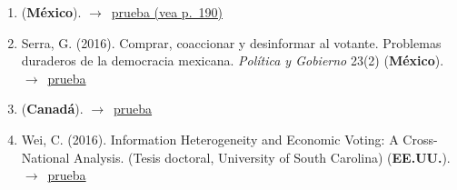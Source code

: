 \documentclass[12 pt, letter]{article}
\newenvironment{CitasMiTrabajo}{
    \begin{footnotesize}
    \begin{enumerate}[label={\footnotesize\emph{cita~\arabic*}},ref=\arabic*] %
        \setlength{\itemsep}{.1\itemsep}
        \setlength{\parskip}{.1\parskip}
    }{\end{enumerate}\end{footnotesize}}
\begin{document}
        


        \begin{CitasMiTrabajo}
        \item {} (\textbf{M\'exico}). $\rightarrow$~\href{http://www.politicaygobierno.cide.edu/index.php/pyg/article/view/1297/988}{prueba (vea p.\ 190)}

        \item Serra, G. (2016). Comprar, coaccionar y desinformar al votante. Problemas duraderos de la democracia mexicana. \emph{Pol\'itica y Gobierno} 23(2) (\textbf{M\'exico}). $\rightarrow$~\href{http://www.scielo.org.mx/scielo.php?pid=S1665-20372016000200409&script=sci_arttext&tlng=en}{prueba}          

        \item {} (\textbf{Canad\'a}). $\rightarrow$~\href{http://www.ieim.uqam.ca/IMG/pdf/chroniques_des_ameriques_-_nafta.pdf}{prueba}

        \item Wei, C. (2016). Information Heterogeneity and Economic Voting: A Cross-National Analysis. (Tesis doctoral, University of South Carolina) (\textbf{EE.UU.}). $\rightarrow$~\href{https://scholarcommons.sc.edu/etd/3847}{prueba}          


          
        \label{ncites:magar.2007ref.2015} %

        \end{CitasMiTrabajo}


        
\end{document}
